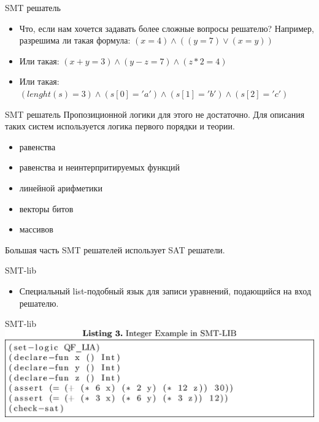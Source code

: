 \documentclass{beamer}
\begin{document}
\begin{frame}{SMT решатель}
\begin{itemize}
\item Что, если нам хочется задавать более сложные вопросы решателю? Например, разрешима ли такая формула:
$(x = 4) \wedge ((y = 7) \vee (x = y))$
\item Или такая: $(x + y = 3) \wedge (y - z = 7) \wedge (z * 2 = 4)$
\item Или такая: $(lenght(s) = 3) \wedge (s[0] = 'a') \wedge (s[1] = 'b') \wedge (s[2] = 'c')$
\end{itemize}
\end{frame}

\begin{frame}{SMT решатель}
Пропозиционной логики для этого не достаточно. Для описания таких систем используется логика первого порядки и теории.
\begin{itemize}
\item равенства
\item равенства и неинтерпритируемых функций
\item линейной арифметики
\item векторы битов
\item массивов
\end{itemize}
Большая часть SMT решателей использует SAT решатели.
\end{frame}

\begin{frame}{SMT-lib}
\begin{itemize}
\item Специальный list-подобный язык для записи уравнений, подающийся на вход решателю.
\end{itemize}
\end{frame}

\begin{frame}{SMT-lib}
\includegraphics[scale=1.0]{SMT-LIB.png}
\end{frame}
\end{document}
